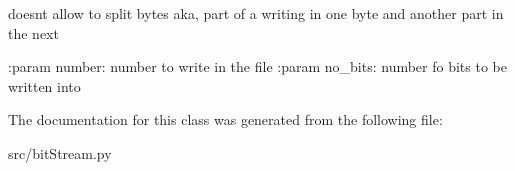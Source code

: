 doesnt allow to split bytes aka, part of a writing in one byte and another part in the next 

\begin{DoxyVerb}:param number: number to write in the file
:param no_bits: number fo bits to be written into
\end{DoxyVerb}
 

The documentation for this class was generated from the following file\+:\begin{DoxyCompactItemize}
\item 
src/bit\+Stream.\+py\end{DoxyCompactItemize}
